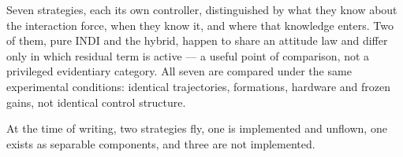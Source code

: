 
Seven strategies, each its own controller, distinguished by what they know about the interaction
force, when they know it, and where that knowledge enters. Two of them, pure INDI and the hybrid,
happen to share an attitude law and differ only in which residual term is active --- a useful point
of comparison, not a privileged evidentiary category. All seven are compared under the same
experimental conditions: identical trajectories, formations, hardware and frozen gains, not
identical control structure.

At the time of writing, two strategies fly, one is implemented and unflown, one exists as separable
components, and three are not implemented.





